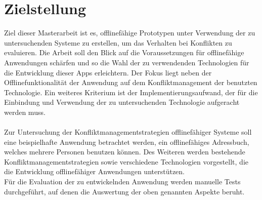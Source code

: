 \section{Zielstellung}
Ziel dieser Masterarbeit ist es, offlinefähige Prototypen unter Verwendung der zu untersuchenden Systeme zu erstellen, um das Verhalten bei Konflikten zu evaluieren.
Die Arbeit soll den Blick auf die Voraussetzungen für offlinefähige Anwendungen schärfen und so die Wahl der zu verwendenden Technologien für die Entwicklung dieser \glspl{App} erleichtern.
Der Fokus liegt neben der Offlinefunktionalität der Anwendung auf dem Konfliktmanagement der benutzten Technologie.
Ein weiteres Kriterium ist der Implementierungsaufwand, der für die Einbindung und Verwendung der zu untersuchenden Technologie aufgeracht werden muss.\\\\
%
Zur Untersuchung der Konfliktmanagementstrategien offlinefähiger Systeme soll eine beispielhafte Anwendung betrachtet werden, ein offlinefähiges Adressbuch, welches mehrere Personen benutzen können.
Des Weiteren werden bestehende Konfliktmanagementstrategien sowie verschiedene Technologien vorgestellt, die die Entwicklung offlinefähiger Anwendungen unterstützen.\\
Für die Evaluation der zu entwickelnden Anwendung werden manuelle Tests durchgeführt, auf denen die Auswertung der oben genannten Aspekte beruht.
